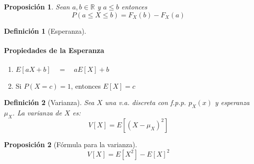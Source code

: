 \documentclass{article}
\newtheorem{mydef}{Definici\'on}
\newtheorem{prop}{Proposici\'on}
\begin{document}
\begin{prop}
  Sean $a, b \in \mathbb{R} $ y $a \leq b$ entonces
  \[
    P(a \leq X \leq b) = F_X(b) - F_X(a)
  \]
\end{prop}

\begin{mydef}[Esperanza]
\end{mydef}

\paragraph{Propiedades de la Esperanza}
\begin{enumerate}
\item \(E[aX+b] \quad = \quad aE[X]+b \)
\item Si $P(X = c) = 1$, entonces $E[X]= c$
\end{enumerate}

\begin{mydef}[Varianza]
  Sea $X$ una v.a. discreta con f.p.p. $p_X(x)$ y esperanza $\mu_X$.
  La \emph{varianza}  de $X$ es:
  \[
    V[X] = E[(X - \mu_X)^2]
  \]
\end{mydef}

\begin{prop}[F\'ormula para la varianza]
  \[
    V[X] = E[X^2] - E[X]^2
  \]
\end{prop}
\end{document}
